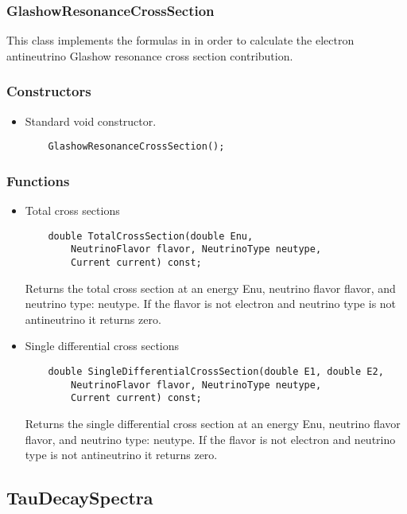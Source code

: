 \subsubsection{GlashowResonanceCrossSection}

This class implements the formulas in \citep{GhandiReno} in order to calculate the electron antineutrino Glashow resonance cross section contribution.

\subsubsection{Constructors}

\begin{itemize}
\item Standard void constructor.
  \begin{lstlisting}
    GlashowResonanceCrossSection();
  \end{lstlisting}
\end{itemize}

\subsubsection{Functions}

\begin{itemize}
\item Total cross sections
  \begin{lstlisting}
    double TotalCrossSection(double Enu,
    	NeutrinoFlavor flavor, NeutrinoType neutype,
    	Current current) const;
  \end{lstlisting}
     Returns the total cross section at an energy {\ttf Enu}, neutrino flavor {\ttf flavor}, and neutrino type: {\ttf neutype}.
     If the flavor is not electron and neutrino type is not antineutrino it returns zero.              
\item Single differential cross sections
  \begin{lstlisting}
    double SingleDifferentialCrossSection(double E1, double E2,
    	NeutrinoFlavor flavor, NeutrinoType neutype,
    	Current current) const;
  \end{lstlisting}
  Returns the single differential cross section at an energy {\ttf Enu}, neutrino flavor {\ttf flavor}, 
  and neutrino type: {\ttf neutype}.
     If the flavor is not electron and neutrino type is not antineutrino it returns zero.   
      
\end{itemize}

\subsection{TauDecaySpectra}

